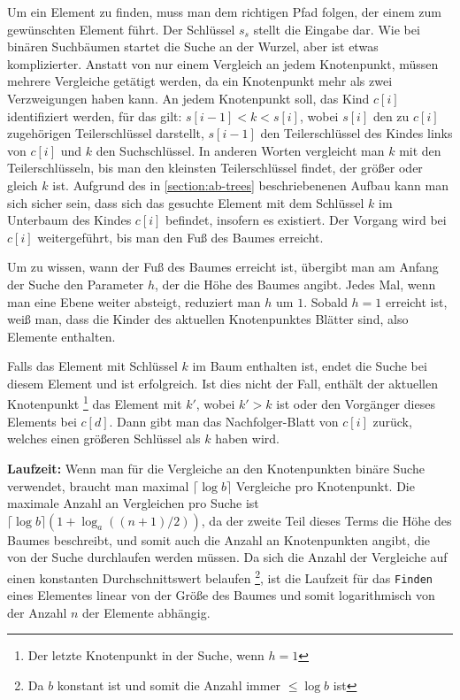 Um ein Element zu finden, muss man dem richtigen Pfad folgen, der einem zum gewünschten Element führt. Der Schlüssel $s_s$ stellt die Eingabe dar. Wie bei binären Suchbäumen startet die Suche an der Wurzel, aber ist etwas komplizierter. Anstatt von nur einem Vergleich an jedem Knotenpunkt, müssen mehrere Vergleiche getätigt werden, da ein Knotenpunkt mehr als zwei Verzweigungen haben kann. An jedem Knotenpunkt soll, das Kind $c[i]$ identifiziert werden, für das gilt: $s[i-1] < k < s[i]$, wobei $s[i]$ den zu $c[i]$ zugehörigen Teilerschlüssel darstellt, $s[i-1]$ den Teilerschlüssel des Kindes links von $c[i]$ und $k$ den Suchschlüssel. In anderen Worten vergleicht man $k$ mit den Teilerschlüsseln, bis man den kleinsten Teilerschlüssel findet, der größer oder gleich $k$ ist. Aufgrund des in \autoref{section:ab-trees} beschriebenenen Aufbau kann man sich sicher sein, dass sich das gesuchte Element mit dem Schlüssel $k$ im Unterbaum des Kindes $c[i]$ befindet, insofern es existiert. Der Vorgang wird bei $c[i]$ weitergeführt, bis man den Fuß des Baumes erreicht.
\par
Um zu wissen, wann der Fuß des Baumes erreicht ist, übergibt man am Anfang der Suche den Parameter $h$, der die Höhe des Baumes angibt. Jedes Mal, wenn man eine Ebene weiter absteigt, reduziert man $h$ um $1$. Sobald $h = 1$ erreicht ist, weiß man, dass die Kinder des aktuellen Knotenpunktes Blätter sind, also Elemente enthalten.
\par
Falls das Element mit Schlüssel $k$ im Baum enthalten ist, endet die Suche bei diesem Element und ist erfolgreich. Ist dies nicht der Fall, enthält der aktuellen Knotenpunkt \footnote{Der letzte Knotenpunkt in der Suche, wenn $h = 1$} das Element mit $k'$, wobei $k' > k$ ist oder den Vorgänger dieses Elements bei $c[d]$. Dann gibt man das Nachfolger-Blatt von $c[i]$ zurück, welches einen größeren Schlüssel als $k$ haben wird.
\par
\textbf{Laufzeit: } Wenn man für die Vergleiche an den Knotenpunkten binäre Suche verwendet, braucht man maximal $\lceil \log b \rceil$ Vergleiche pro Knotenpunkt. Die maximale Anzahl an Vergleichen pro Suche ist $\lceil \log b \rceil (1+\log_a((n+1)/2))$, da der zweite Teil dieses Terms die Höhe des Baumes beschreibt, und somit auch die Anzahl an Knotenpunkten angibt, die von der Suche durchlaufen werden müssen. Da sich die Anzahl der Vergleiche auf einen konstanten Durchschnittswert belaufen \footnote{Da $b$ konstant ist und somit die Anzahl immer $\leq \log b$ ist}, ist die Laufzeit für das \texttt{Finden} eines Elementes linear von der Größe des Baumes und somit logarithmisch von der Anzahl $n$ der Elemente abhängig.\\
\cite{Sanders:19}


